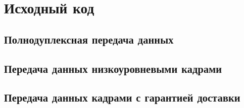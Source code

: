 \documentclass[a4paper,10pt]{article}
\begin{document}
\appendix
\section{Исходный код}
\label{appendix:sources}


\subsection{Полнодуплексная передача данных}
\label{appendix:sources:duplex-link}

\subsection{Передача данных низкоуровневыми кадрами}
\label{appendix:sources:frame}

\subsection{Передача данных кадрами с гарантией доставки}
\label{appendix:sources:sliding-window}


\pagebreak



\end{document}
